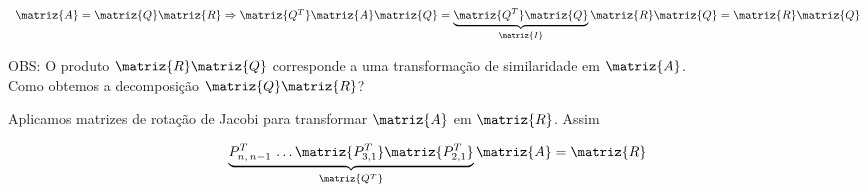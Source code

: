 \[
 \begin{array}{l}
  \matriz{A} = \matriz{Q} \matriz{R} \Rightarrow \matriz{Q^T} \matriz{A} \matriz{Q} = \underbrace{\matriz{Q^T} \matriz{Q}}_{\matriz{I}} \matriz{R} \matriz{Q} = \matriz{R} \matriz{Q}
 \end{array}
\]

OBS: O produto $ \matriz{R} \matriz{Q} $ corresponde a uma transformação de similaridade em $ \matriz{A} $.\\

Como obtemos a decomposição $ \matriz{Q} \matriz{R} $?

Aplicamos matrizes de rotação de Jacobi para transformar $ \matriz{A} $ em $ \matriz{R} $. Assim

\begin{equation}
 \label{cap5:sec5:eq13}
 \begin{array}{l}
  \underbrace{P_{n,\,n-1}^T \, \ldots \matriz{P_{3,1}^T} \matriz{P_{2,1}^T}}_{\matriz{Q^T}} \matriz{A} = \matriz{R}
 \end{array}
% 
% 
\end{equation}

